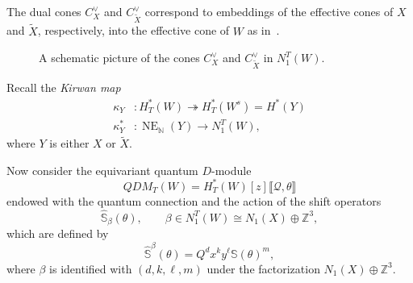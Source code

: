 \documentclass[leqno, openany]{memoir}
\theoremstyle{definition}
\theoremstyle{remark}
\theoremstyle{plain}
\theoremstyle{definition}
\theoremstyle{remark}
\newcommand{\N}{\mathbb{N}}
\newcommand{\Z}{\mathbb{Z}}
\newcommand{\mc}[1]{\mathcal{#1}}
\newcommand{\mb}[1]{\mathbb{#1}}
\newcommand{\on}[1]{\operatorname{#1}}
\newcommand{\wt}[1]{\widetilde{#1}}
\newcommand{\wh}[1]{\widehat{#1}}
\begin{document}
The dual cones $C_X^{\vee}$ and $C_{\wt{X}}^{\vee}$ correspond to embeddings of the effective cones of $X$ and $\wt{X}$, respectively, into the effective cone of $W$ as in~.

\begin{figure}[htpb]
\centering 
{} 

\caption{A schematic picture of the cones $C_X^{ \vee }$ and $C_{ \wt{X} }^{ \vee }$ in $N_1^T(W)$.} 
\label{fig:Mori_cones} 
\end{figure} 

Recall the \textit{Kirwan map}
\begin{align*}
    \kappa_Y &\colon H_T^*(W) \twoheadrightarrow H_T^*(W^s) = H^*(Y) \\
    \kappa_Y^* &\colon \on{NE}_{\N}(Y) \to N_1^T(W),
\end{align*}
where $Y$ is either $X$ or $\wt{X}$.

Now consider the equivariant quantum $D$-module
\[ QDM_T(W) = H_T^*(W)[z] \llbracket \mc{Q}, \theta \rrbracket \]
endowed with the quantum connection and the action of the shift operators
\[ \wh{\mb{S}}_{\beta}(\theta), \qquad \beta \in N_1^T(W) \cong N_1(X) \oplus \Z^3, \]
which are defined by
\[ \wh{\mb{S}}^{\beta}(\theta) = Q^d x^k y^{\ell} \mb{S}(\theta)^m, \]
where $\beta$ is identified with $(d, k, \ell, m)$ under the factorization $N_1(X) \oplus \Z^3$.
\end{document}
